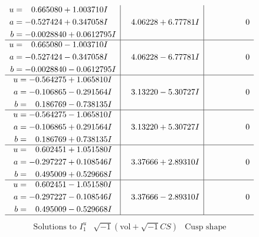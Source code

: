\documentclass[1p]{elsarticle_modified}
\theoremstyle{definition}
\newcommand{\I}{\sqrt{-1}}
\begin{document}
$$\begin{array}{c|c|c}
\begin{aligned}
u &= \phantom{-}0.665080 + 1.003710 I \\
a &= -0.527424 + 0.347058 I \\
b &= -0.0028840 + 0.0612795 I\end{aligned}
 & \phantom{-}4.06228 + 6.77781 I & \phantom{-0.000000 } 0 \\ \hline\begin{aligned}
u &= \phantom{-}0.665080 - 1.003710 I \\
a &= -0.527424 - 0.347058 I \\
b &= -0.0028840 - 0.0612795 I\end{aligned}
 & \phantom{-}4.06228 - 6.77781 I & \phantom{-0.000000 } 0 \\ \hline\begin{aligned}
u &= -0.564275 + 1.065810 I \\
a &= -0.106865 - 0.291564 I \\
b &= \phantom{-}0.186769 - 0.738135 I\end{aligned}
 & \phantom{-}3.13220 - 5.30727 I & \phantom{-0.000000 } 0 \\ \hline\begin{aligned}
u &= -0.564275 - 1.065810 I \\
a &= -0.106865 + 0.291564 I \\
b &= \phantom{-}0.186769 + 0.738135 I\end{aligned}
 & \phantom{-}3.13220 + 5.30727 I & \phantom{-0.000000 } 0 \\ \hline\begin{aligned}
u &= \phantom{-}0.602451 + 1.051580 I \\
a &= -0.297227 + 0.108546 I \\
b &= \phantom{-}0.495009 + 0.529668 I\end{aligned}
 & \phantom{-}3.37666 + 2.89310 I & \phantom{-0.000000 } 0 \\ \hline\begin{aligned}
u &= \phantom{-}0.602451 - 1.051580 I \\
a &= -0.297227 - 0.108546 I \\
b &= \phantom{-}0.495009 - 0.529668 I\end{aligned}
 & \phantom{-}3.37666 - 2.89310 I & \phantom{-0.000000 } 0\\
 \hline 
 \end{array}$$\newpage$$\begin{array}{c|c|c}  
\text{Solutions to }I^u_{1}& \I (\text{vol} + \sqrt{-1}CS) & \text{Cusp shape}\\

\end{array}$$
\end{document}
